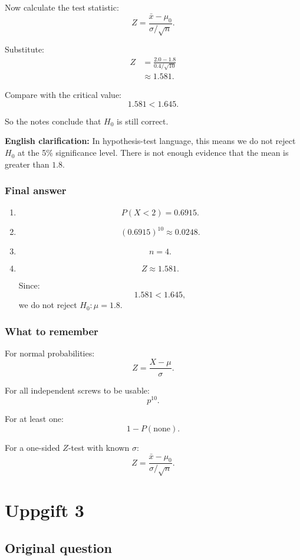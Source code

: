 \documentclass[10pt]{article}
\begin{document}
Now calculate the test statistic:
\[
Z=
\frac{\bar{x}-\mu_0}{\sigma/\sqrt{n}}.
\]

Substitute:
\begin{align*}
Z
&=
\frac{2.0-1.8}{0.4/\sqrt{10}}
\\[2mm]
&\approx
1.581.
\end{align*}

Compare with the critical value:
\[
1.581<1.645.
\]

So the notes conclude that \(H_0\) is still correct.

\textbf{English clarification:}
In hypothesis-test language, this means we do not
reject \(H_0\) at the 5\% significance level.
There is not enough evidence that the mean is greater
than \(1.8\).

\subsubsection*{Final answer}

\begin{enumerate}[label=\alph*)]
\item
\[
P(X<2)=0.6915.
\]

\item
\[
(0.6915)^{10}\approx 0.0248.
\]

\item
\[
n=4.
\]

\item
\[
Z\approx 1.581.
\]

Since:
\[
1.581<1.645,
\]
we do not reject \(H_0:\mu=1.8\).
\end{enumerate}

\subsubsection*{What to remember}

For normal probabilities:
\[
Z=\frac{X-\mu}{\sigma}.
\]

For all independent screws to be usable:
\[
p^{10}.
\]

For at least one:
\[
1-P(\text{none}).
\]

For a one-sided \(Z\)-test with known \(\sigma\):
\[
Z=
\frac{\bar{x}-\mu_0}{\sigma/\sqrt{n}}.
\]

\section*{Uppgift 3}

\subsection*{Original question}
\end{document}
